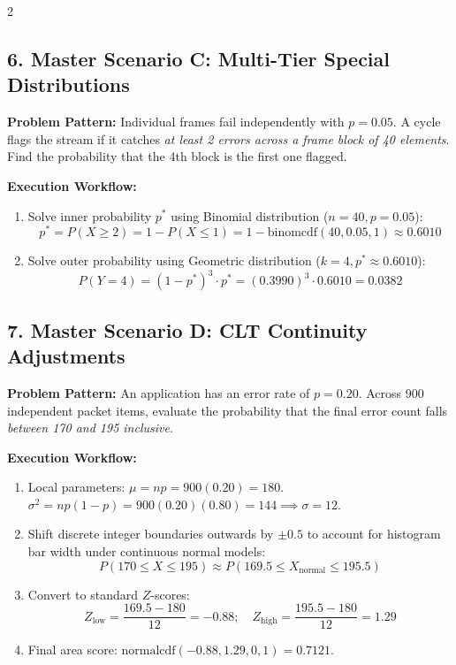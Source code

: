 \documentclass[9pt,landscape]{article}
\begin{document}
\begin{multicols*}{2}
\subsection*{6. Master Scenario C: Multi-Tier Special Distributions}
\textbf{Problem Pattern:} Individual frames fail independently with $p = 0.05$. A cycle flags the stream if it catches \textit{at least 2 errors across a frame block of 40 elements}. Find the probability that the 4th block is the first one flagged.

\textbf{Execution Workflow:}
\begin{enumerate}
    \item Solve inner probability $p^*$ using Binomial distribution ($n=40, p=0.05$):
    $$p^* = P(X \ge 2) = 1 - P(X \le 1) = 1 - \text{binomcdf}(40, 0.05, 1) \approx 0.6010$$
    \item Solve outer probability using Geometric distribution ($k=4, p^* \approx 0.6010$):
    $$P(Y = 4) = (1 - p^*)^3 \cdot p^* = (0.3990)^3 \cdot 0.6010 = \mathbf{0.0382}$$
\end{enumerate}

\subsection*{7. Master Scenario D: CLT Continuity Adjustments}
\textbf{Problem Pattern:} An application has an error rate of $p = 0.20$. Across 900 independent packet items, evaluate the probability that the final error count falls \textit{between 170 and 195 inclusive}.

\textbf{Execution Workflow:}
\begin{enumerate}
    \item Local parameters: $\mu = np = 900(0.20) = 180$. \\
    $\sigma^2 = np(1-p) = 900(0.20)(0.80) = 144 \implies \sigma = 12$.
    \item Shift discrete integer boundaries outwards by $\pm 0.5$ to account for histogram bar width under continuous normal models:
    $$P(170 \le X \le 195) \approx P(169.5 \le X_{\text{normal}} \le 195.5)$$
    \item Convert to standard $Z$-scores:
    $$Z_{\text{low}} = \frac{169.5 - 180}{12} = -0.88; \quad Z_{\text{high}} = \frac{195.5 - 180}{12} = 1.29$$
    \item Final area score: $\text{normalcdf}(-0.88, 1.29, 0, 1) = \mathbf{0.7121}$.
\end{enumerate}


\end{multicols*}
\end{document}
